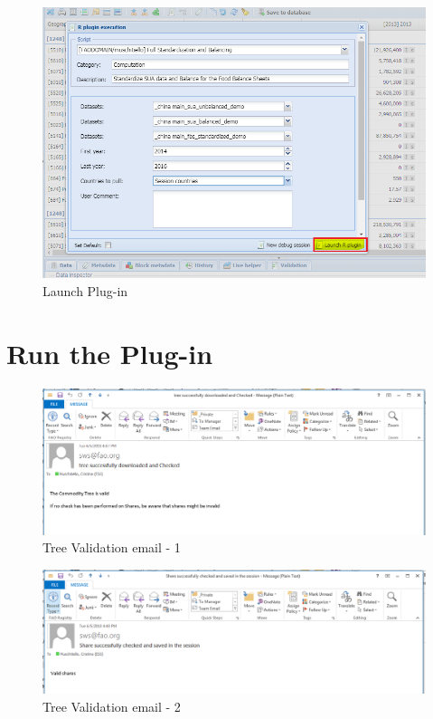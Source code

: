 \documentclass[]{article}
\begin{document}
\begin{figure}[H]

{\centering \includegraphics[width=1\linewidth]{images/standPlugin/29_launch} 

}

\caption{\label{fig:f30}Launch Plug-in}\label{fig:f30}
\end{figure}

\section{Run the Plug-in}\label{run-the-plug-in}

\begin{figure}[H]

{\centering \includegraphics[width=1\linewidth]{images/standPlugin/31_email1} 

}

\caption{\label{fig:f31}Tree Validation email - 1}\label{fig:f31}
\end{figure}

\begin{figure}[H]

{\centering \includegraphics[width=1\linewidth]{images/standPlugin/32_email2} 

}

\caption{\label{fig:f32}Tree Validation email - 2}\label{fig:f32}
\end{figure}
\end{document}
